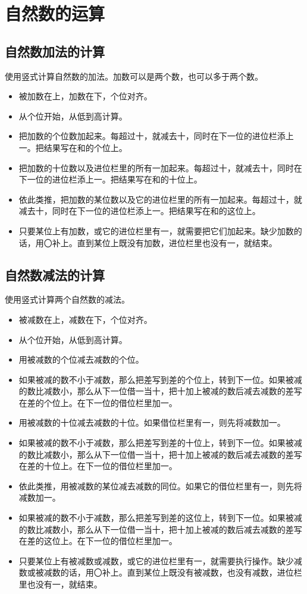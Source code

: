 \documentclass[12pt,UTF8]{ctexart}
\begin{document}
\section{自然数的运算}

\subsection{自然数加法的计算}

使用竖式计算自然数的加法。加数可以是两个数，也可以多于两个数。

\begin{itemize}
\item 被加数在上，加数在下，个位对齐。
\item 从个位开始，从低到高计算。
\item 把加数的个位数加起来。每超过十，就减去十，同时在下一位的进位栏添上一。把结果写在和的个位上。
\item 把加数的十位数以及进位栏里的所有一加起来。每超过十，就减去十，同时在下一位的进位栏添上一。把结果写在和的十位上。
\item 依此类推，把加数的某位数以及它的进位栏里的所有一加起来。每超过十，就减去十，同时在下一位的进位栏添上一。把结果写在和的这位上。
\item 只要某位上有加数，或它的进位栏里有一，就需要把它们加起来。缺少加数的话，用〇补上。直到某位上既没有加数，进位栏里也没有一，就结束。
\end{itemize}

\subsection{自然数减法的计算}

使用竖式计算两个自然数的减法。

\begin{itemize}
\item 被减数在上，减数在下，个位对齐。
\item 从个位开始，从低到高计算。
\item 用被减数的个位减去减数的个位。
\item 如果被减的数不小于减数，那么把差写到差的个位上，转到下一位。如果被减的数比减数小，那么从下一位借一当十，把十加上被减的数后减去减数的差写在差的个位上。在下一位的借位栏里加一。
\item 用被减数的十位减去减数的十位。如果借位栏里有一，则先将减数加一。
\item 如果被减的数不小于减数，那么把差写到差的十位上，转到下一位。如果被减的数比减数小，那么从下一位借一当十，把十加上被减的数后减去减数的差写在差的十位上。在下一位的借位栏里加一。
\item 依此类推，用被减数的某位减去减数的同位。如果它的借位栏里有一，则先将减数加一。
\item 如果被减的数不小于减数，那么把差写到差的这位上，转到下一位。如果被减的数比减数小，那么从下一位借一当十，把十加上被减的数后减去减数的差写在差的这位上。在下一位的借位栏里加一。
\item 只要某位上有被减数或减数，或它的进位栏里有一，就需要执行操作。缺少减数或被减数的话，用〇补上。直到某位上既没有被减数，也没有减数，进位栏里也没有一，就结束。
\end{itemize}
\end{document}
